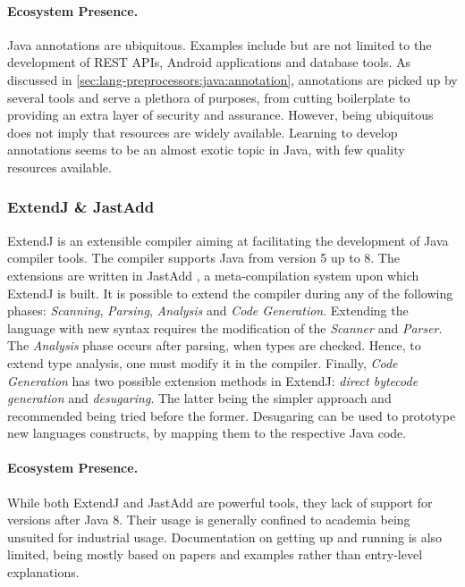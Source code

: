 \paragraph{Ecosystem Presence.}
Java annotations are ubiquitous.
Examples include but are not limited to the development of REST \gls{API}s,
Android applications and database tools.
As discussed in \autoref{sec:lang-preprocessors:java:annotation},
annotations are picked up by several tools and serve a plethora of purposes,
from cutting boilerplate to providing an extra layer of security and assurance.
However, being ubiquitous does not imply that resources are widely available.
Learning to develop annotations seems to be an almost exotic topic in Java,
with few quality resources available.

\subsubsection*{ExtendJ \& JastAdd}\label{sec:lang-preprocessors:java:extendj}

ExtendJ is an extensible compiler aiming at facilitating the development of Java compiler tools.
The compiler supports Java from version 5 up to 8.
The extensions are written in JastAdd \autocite{JastAdd2021}, a meta-compilation system upon which ExtendJ is built.
It is possible to extend the compiler during any of the following phases: \emph{Scanning}, \emph{Parsing}, \emph{Analysis} and \emph{Code Generation}.
Extending the language with new syntax requires the modification of the \emph{Scanner} and \emph{Parser}.
The \emph{Analysis} phase occurs after parsing, when types are checked.
Hence, to extend type analysis, one must modify it in the compiler.
Finally, \emph{Code Generation} has two possible extension methods in ExtendJ:
\emph{direct bytecode generation} and \emph{desugaring}.
The latter being the simpler approach and recommended being tried before the former.
Desugaring can be used to prototype new languages constructs, by mapping them to the respective Java code.

\paragraph{Ecosystem Presence.}
While both ExtendJ and JastAdd are powerful tools, they lack of support for versions after Java 8.
Their usage is generally confined to academia being unsuited for industrial usage.
Documentation on getting up and running is also limited,
being mostly based on papers and examples rather than entry-level explanations.

